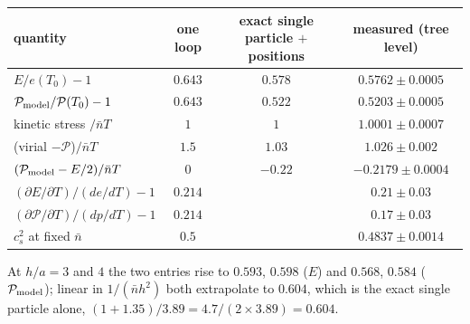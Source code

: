 \documentclass[11pt,aps,preprint,nofootinbib,superscriptaddress,tightenlines]{revtex4-2}
\def\pr{{\mathcal P}}
\def\er{e}
\begin{document}
\begin{center}
\begin{tabular}{lccc}
\toprule
quantity & one loop & exact single particle $+$ positions & measured (tree level) \\
\midrule
$E/\er(T_0)-1$ & $0.643$ & $0.578$ & $0.5762\pm0.0005$ \\
$\pr_{\rm model}/\pr(T_0)-1$ & $0.643$ & $0.522$ & $0.5203\pm0.0005$ \\
kinetic stress $/\bar nT$ & $1$ & $1$ & $1.0001\pm0.0007$ \\
(virial $-\pr$)$/\bar nT$ & $1.5$ & $1.03$ & $1.026\pm0.002$ \\
$(\pr_{\rm model}-E/2)/\bar nT$ & $0$ & $-0.22$ & $-0.2179\pm0.0004$ \\
$(\partial E/\partial T)/(de/dT)-1$ & $0.214$ & & $0.21\pm0.03$ \\
$(\partial\pr/\partial T)/(dp/dT)-1$ & $0.214$ & & $0.17\pm0.03$ \\
$c_s^2$ at fixed $\bar n$ & $0.5$ & & $0.4837\pm0.0014$ \\
\bottomrule
\end{tabular}
\end{center}
At $h/a=3$ and $4$ the two entries rise to $0.593$, $0.598$ ($E$) and $0.568$, $0.584$ ($\pr_{\rm model}$); linear in $1/(\bar nh^2)$ both extrapolate to $0.604$, which is
the exact single particle alone, $(1+1.35)/3.89=4.7/(2\times3.89)=0.604$.
\end{document}

